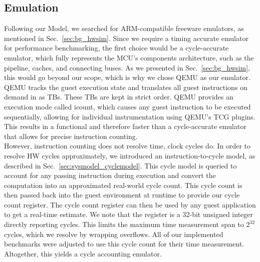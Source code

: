 \documentclass[english]{tudscrartcl}
\begin{document}
		\subsection{Emulation}
			\label{sec:meth_emu}
			Following our Model, we searched for ARM-compatible freeware emulators, as mentioned in Sec.~\ref{sec:bg_hwsim}.
			Since we require a timing accurate emulator for performance benchmarking, the first choice would be a cycle-accurate emulator, which fully represents the \ac{MCU}'s components architecture, such as the pipeline, caches, and connecting buses.
			As we presented in Sec.~\ref{sec:bg_hwsim}, this would go beyond our scope, which is why we chose QEMU as our emulator.
			\\
			QEMU tracks the guest execution state and translates all guest instructions on demand in as \acp{TB}.
			These \acp{TB} are kept in strict order.
			QEMU provides an execution mode called icount, which causes any guest instruction to be executed sequentially, allowing for individual instrumentation using QEMU's TCG plugins.
			This results in a functional and therefore faster than a cycle-accurate emulator that allows for precise instruction counting.
			\\
			However, instruction counting does not resolve time, clock cycles do.
			In order to resolve \ac{HW} cycles approximately, we introduced an instruction-to-cycle model, as described in Sec.~\ref{sec:sysmodel_cyclemodel}.
			This cycle model is queried to account for any passing instruction during execution and convert the computation into an approximated real-world cycle count.
			This cycle count is then passed back into the guest environment at runtime to provide our cycle count register.
			The cycle count register can then be used by any guest application to get a real-time estimate.
			We note that the register is a 32-bit unsigned integer directly reporting cycles.
			This limits the maximum time measurement span to $2^{32}$ cycles, which we resolve by wrapping overflows.
			All of our implemented benchmarks were adjusted to use this cycle count for their time measurement.
			Altogether, this yields a cycle accounting emulator.
			\\
\end{document}
